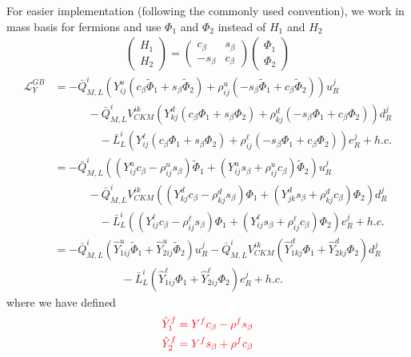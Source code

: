 \documentclass[12pt]{article}
\begin{document}
For easier implementation (following the commonly used convention), we work in mass basis for fermions and use $\Phi_{1}$ and $\Phi_{2}$ instead of $H_{1}$ and $H_{2}$
\begin{align}
\begin{pmatrix}
H_{1} \\
H_{2}
\end{pmatrix} = \begin{pmatrix}
c_{\beta} & s_{\beta} \\
-s_{\beta} & c_{\beta}
\end{pmatrix}\begin{pmatrix}
\Phi_{1} \\
\Phi_{2}
\end{pmatrix}
\end{align}
\begin{align}
\mathcal{L}_{Y}^{GB} &= -\bar{Q}_{M,L}^{i}(Y_{ij}^{u}(c_{\beta}\tilde{\Phi}_{1}+s_{\beta}\tilde{\Phi}_{2})+\rho_{ij}^{u}(-s_{\beta}\tilde{\Phi}_{1}+c_{\beta}\tilde{\Phi}_{2}))u_{R}^{j}\nonumber\\
&\qquad\quad - \bar{Q}_{M,L}^{i}V_{CKM}^{ik}(Y_{kj}^{d}(c_{\beta}\Phi_{1}+s_{\beta}\Phi_{2})+\rho_{kj}^{d}(-s_{\beta}\Phi_{1}+c_{\beta}\Phi_{2}))d_{R}^{j}\nonumber\\
&\qquad\qquad - \bar{L}_{L}^{i}(Y_{ij}^{\ell}(c_{\beta}\Phi_{1}+s_{\beta}\Phi_{2})+\rho_{ij}^{\ell}(-s_{\beta}\Phi_{1}+c_{\beta}\Phi_{2}))e_{R}^{j} + h.c. \nonumber\\
&=-\bar{Q}_{M,L}^{i}((Y^{u}_{ij}c_{\beta}-\rho_{ij}^{u}s_{\beta})\tilde{\Phi}_{1}+(Y_{ij}^{u}s_{\beta}+\rho_{ij}^{u}c_{\beta})\tilde{\Phi}_{2})u_{R}^{j}\nonumber \\
&\qquad\quad - \bar{Q}_{M,L}^{i}V_{CKM}^{ik}((Y_{kj}^{d}c_{\beta}-\rho_{kj}^{d}s_{\beta})\Phi_{1}+(Y_{jk}^{d}s_{\beta}+\rho_{kj}^{d}c_{\beta})\Phi_{2})d_{R}^{j}\nonumber \\
&\qquad\qquad - \bar{L}_{L}^{i}((Y_{ij}^{\ell}c_{\beta}-\rho_{ij}^{\ell}s_{\beta})\Phi_{1}+(Y_{ij}^{\ell}s_{\beta}+\rho_{ij}^{\ell}c_{\beta})\Phi_{2})e_{R}^{j} + h.c. \nonumber\\
&=-\bar{Q}_{M,L}^{i}(\hat{Y}_{1ij}^{u}\tilde{\Phi}_{1}+\hat{Y}_{2ij}^{u}\tilde{\Phi}_{2})u_{R}^{j} - \bar{Q}_{M,L}^{i}V_{CKM}^{ik}(\hat{Y}_{1kj}^{d}\Phi_{1}+\hat{Y}_{2kj}^{d}\Phi_{2})d_{R}^{j} \nonumber\\
&\qquad\qquad\qquad -\bar{L}_{L}^{i}(\hat{Y}_{1ij}^{\ell}\Phi_{1}+\hat{Y}_{2ij}^{\ell}\Phi_{2})e_{R}^{j} + h.c.
\end{align}
where we have defined
\begin{align}
&{\color{red}\hat{Y}_{1}^{f}= Y^{f}c_{\beta}-\rho^{f}s_{\beta}}\\
&{\color{red}\hat{Y}_{2}^{f} = Y^{f}s_{\beta}+\rho^{f}c_{\beta}}
\end{align}
\end{document}
